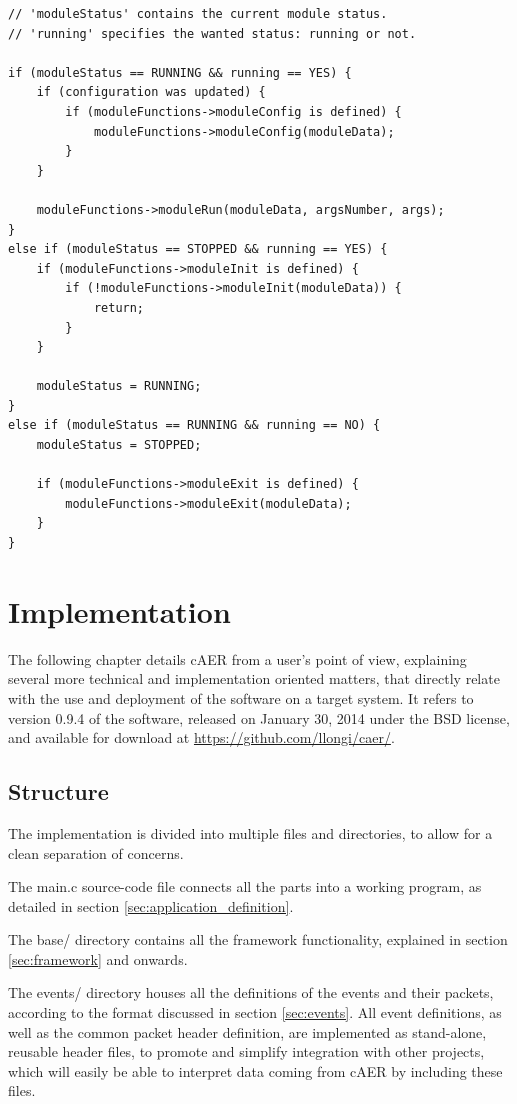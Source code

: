 \documentclass[a4paper,12pt]{report}
\begin{document}
\begin{lstlisting}
// 'moduleStatus' contains the current module status.
// 'running' specifies the wanted status: running or not.

if (moduleStatus == RUNNING && running == YES) {
    if (configuration was updated) {
        if (moduleFunctions->moduleConfig is defined) {
            moduleFunctions->moduleConfig(moduleData);
        }
    }

    moduleFunctions->moduleRun(moduleData, argsNumber, args);
}
else if (moduleStatus == STOPPED && running == YES) {
    if (moduleFunctions->moduleInit is defined) {
        if (!moduleFunctions->moduleInit(moduleData)) {
            return;
        }
    }

    moduleStatus = RUNNING;
}
else if (moduleStatus == RUNNING && running == NO) {
    moduleStatus = STOPPED;

    if (moduleFunctions->moduleExit is defined) {
        moduleFunctions->moduleExit(moduleData);
    }
}
\end{lstlisting}

\chapter{Implementation} \label{chap:implementation}

The following chapter details cAER from a user's point of view, explaining several more technical and implementation oriented matters, that directly relate with the use and deployment of the software on a target system.
It refers to version 0.9.4 of the software, released on January 30, 2014 under the BSD license, and available for download at \url{https://github.com/llongi/caer/}.

\section{Structure} \label{sec:structure}

The implementation is divided into multiple files and directories, to allow for a clean separation of concerns.

The main.c source-code file connects all the parts into a working program, as detailed in section \ref{sec:application_definition}.

The base/ directory contains all the framework functionality, explained in section \ref{sec:framework} and onwards.

The events/ directory houses all the definitions of the events and their packets, according to the format discussed in section \ref{sec:events}.
All event definitions, as well as the common packet header definition, are implemented as stand-alone, reusable header files, to promote and simplify integration with other projects, which will easily be able to interpret data coming from cAER by including these files.
\end{document}
